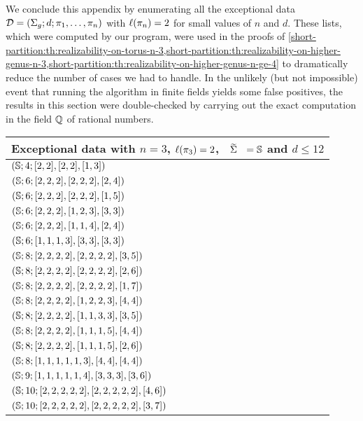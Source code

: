 We conclude this appendix by enumerating all the exceptional data $\mathcal{D}=(\Sigma_{g};d;\pi_1,\ldots,\pi_n)$ with $\ell(\pi_n)=2$ for small values of $n$ and $d$. These lists, which were computed by our \Cpp{} program, were used in the proofs of \cref{short-partition:th:realizability-on-torus-n-3,short-partition:th:realizability-on-higher-genus-n-3,short-partition:th:realizability-on-higher-genus-n-ge-4} to dramatically reduce the number of cases we had to handle. In the unlikely (but not impossible) event that running the algorithm in finite fields yields some false positives, the results in this section were double-checked by carrying out the exact computation in the field $\mathbb{Q}$ of rational numbers.

\begin{tabularx}{\mytablewidth}{l}
\toprule
\multicolumn{1}{l}{Exceptional data with $n=3$, $\ell(\pi_3)=2$, $\tSigma=\sphere{}$ and $d\le 12$}\\
\midrule
$(\mathbb{S};4;[2, 2],[2, 2],[1, 3])$\\
$(\mathbb{S};6;[2, 2, 2],[2, 2, 2],[2, 4])$\\
$(\mathbb{S};6;[2, 2, 2],[2, 2, 2],[1, 5])$\\
$(\mathbb{S};6;[2, 2, 2],[1, 2, 3],[3, 3])$\\
$(\mathbb{S};6;[2, 2, 2],[1, 1, 4],[2, 4])$\\
$(\mathbb{S};6;[1, 1, 1, 3],[3, 3],[3, 3])$\\
$(\mathbb{S};8;[2, 2, 2, 2],[2, 2, 2, 2],[3, 5])$\\
$(\mathbb{S};8;[2, 2, 2, 2],[2, 2, 2, 2],[2, 6])$\\
$(\mathbb{S};8;[2, 2, 2, 2],[2, 2, 2, 2],[1, 7])$\\
$(\mathbb{S};8;[2, 2, 2, 2],[1, 2, 2, 3],[4, 4])$\\
$(\mathbb{S};8;[2, 2, 2, 2],[1, 1, 3, 3],[3, 5])$\\
$(\mathbb{S};8;[2, 2, 2, 2],[1, 1, 1, 5],[4, 4])$\\
$(\mathbb{S};8;[2, 2, 2, 2],[1, 1, 1, 5],[2, 6])$\\
$(\mathbb{S};8;[1, 1, 1, 1, 1, 3],[4, 4],[4, 4])$\\
$(\mathbb{S};9;[1, 1, 1, 1, 1, 4],[3, 3, 3],[3, 6])$\\
$(\mathbb{S};10;[2, 2, 2, 2, 2],[2, 2, 2, 2, 2],[4, 6])$\\
$(\mathbb{S};10;[2, 2, 2, 2, 2],[2, 2, 2, 2, 2],[3, 7])$\\

\end{tabularx}
